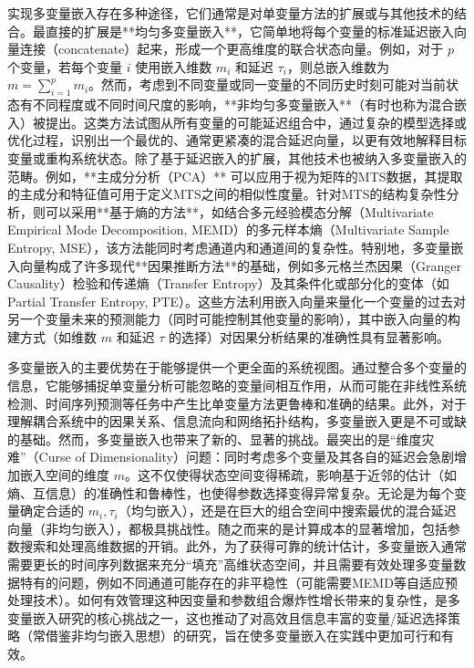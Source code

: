 实现多变量嵌入存在多种途径，它们通常是对单变量方法的扩展或与其他技术的结合。最直接的扩展是**均匀多变量嵌入**，它简单地将每个变量的标准延迟嵌入向量连接（concatenate）起来，形成一个更高维度的联合状态向量。例如，对于 $p$ 个变量，若每个变量 $i$ 使用嵌入维数 $m_i$ 和延迟 $\tau_i$，则总嵌入维数为 $m = \sum_{i=1}^{p} m_i$。然而，考虑到不同变量或同一变量的不同历史时刻可能对当前状态有不同程度或不同时间尺度的影响，**非均匀多变量嵌入**（有时也称为混合嵌入）被提出。这类方法试图从所有变量的可能延迟组合中，通过复杂的模型选择或优化过程，识别出一个最优的、通常更紧凑的混合延迟向量，以更有效地解释目标变量或重构系统状态。除了基于延迟嵌入的扩展，其他技术也被纳入多变量嵌入的范畴。例如，**主成分分析（PCA）** 可以应用于视为矩阵的MTS数据，其提取的主成分和特征值可用于定义MTS之间的相似性度量。针对MTS的结构复杂性分析，则可以采用**基于熵的方法**，如结合多元经验模态分解（Multivariate Empirical Mode Decomposition, MEMD）的多元样本熵（Multivariate Sample Entropy, MSE），该方法能同时考虑通道内和通道间的复杂性。特别地，多变量嵌入向量构成了许多现代**因果推断方法**的基础，例如多元格兰杰因果（Granger Causality）检验和传递熵（Transfer Entropy）及其条件化或部分化的变体（如Partial Transfer Entropy, PTE）。这些方法利用嵌入向量来量化一个变量的过去对另一个变量未来的预测能力（同时可能控制其他变量的影响），其中嵌入向量的构建方式（如维数 $m$ 和延迟 $\tau$ 的选择）对因果分析结果的准确性具有显著影响。

多变量嵌入的主要优势在于能够提供一个更全面的系统视图。通过整合多个变量的信息，它能够捕捉单变量分析可能忽略的变量间相互作用，从而可能在非线性系统检测、时间序列预测等任务中产生比单变量方法更鲁棒和准确的结果。此外，对于理解耦合系统中的因果关系、信息流向和网络拓扑结构，多变量嵌入更是不可或缺的基础。然而，多变量嵌入也带来了新的、显著的挑战。最突出的是“维度灾难”（Curse of Dimensionality）问题：同时考虑多个变量及其各自的延迟会急剧增加嵌入空间的维度 $m$。这不仅使得状态空间变得稀疏，影响基于近邻的估计（如熵、互信息）的准确性和鲁棒性，也使得参数选择变得异常复杂。无论是为每个变量确定合适的 $m_i, \tau_i$（均匀嵌入），还是在巨大的组合空间中搜索最优的混合延迟向量（非均匀嵌入），都极具挑战性。随之而来的是计算成本的显著增加，包括参数搜索和处理高维数据的开销。此外，为了获得可靠的统计估计，多变量嵌入通常需要更长的时间序列数据来充分“填充”高维状态空间，并且需要有效处理多变量数据特有的问题，例如不同通道可能存在的非平稳性（可能需要MEMD等自适应预处理技术）。如何有效管理这种因变量和参数组合爆炸性增长带来的复杂性，是多变量嵌入研究的核心挑战之一，这也推动了对高效且信息丰富的变量/延迟选择策略（常借鉴非均匀嵌入思想）的研究，旨在使多变量嵌入在实践中更加可行和有效。


